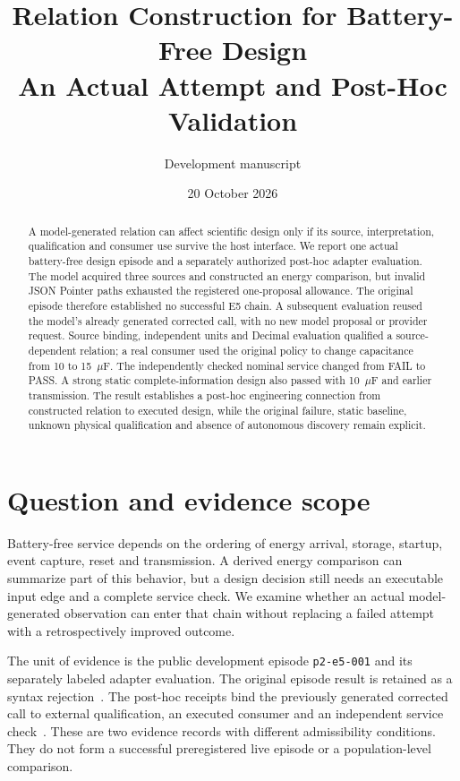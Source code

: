 \documentclass[10pt]{article}
\title{Relation Construction for Battery-Free Design\\An Actual Attempt and Post-Hoc Validation}
\author{Development manuscript}
\date{20 October 2026}
\begin{document}
\maketitle
\begin{abstract}
A model-generated relation can affect scientific design only if its source,
interpretation, qualification and consumer use survive the host interface.
We report one actual battery-free design episode and a separately authorized
post-hoc adapter evaluation. The model acquired three sources and constructed
an energy comparison, but invalid JSON Pointer paths exhausted the registered
one-proposal allowance. The original episode therefore established no successful
E5 chain. A subsequent evaluation reused the model's already generated corrected
call, with no new model proposal or provider request. Source binding, independent
units and Decimal evaluation qualified a source-dependent relation; a real
consumer used the original policy to change capacitance from 10 to 15~$\mu$F.
The independently checked nominal service changed from FAIL to PASS. A strong
static complete-information design also passed with 10~$\mu$F and earlier
transmission. The result establishes a post-hoc engineering connection from
constructed relation to executed design, while the original failure, static
baseline, unknown physical qualification and absence of autonomous discovery
remain explicit.
\end{abstract}

\section{Question and evidence scope}
Battery-free service depends on the ordering of energy arrival, storage,
startup, event capture, reset and transmission. A derived energy comparison
can summarize part of this behavior, but a design decision still needs an
executable input edge and a complete service check. We examine whether an
actual model-generated observation can enter that chain without replacing a
failed attempt with a retrospectively improved outcome.

The unit of evidence is the public development episode
\texttt{p2-e5-001} and its separately labeled adapter evaluation. The original
episode result is retained as a syntax rejection~\cite{attempt}. The
post-hoc receipts bind the previously generated corrected call to external
qualification, an executed consumer and an independent service
check~\cite{qualification,consumer,service}. These are two evidence records
with different admissibility conditions. They do not form a successful
preregistered live episode or a population-level comparison.
\end{document}
